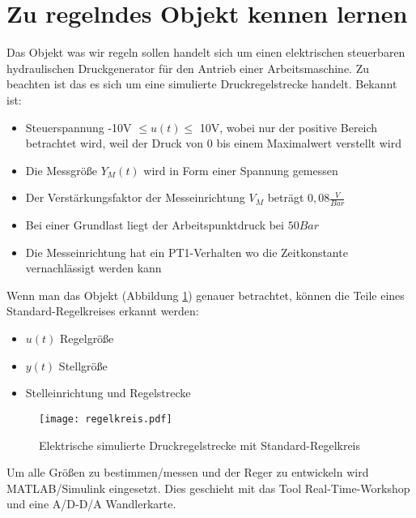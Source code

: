 
\newpage
[Hansert]
\section{Zu regelndes Objekt kennen lernen}
Das Objekt was wir regeln sollen handelt sich um einen elektrischen steuerbaren hydraulischen Druckgenerator für den Antrieb einer Arbeitsmaschine. Zu beachten ist das es sich um eine simulierte Druckregelstrecke handelt. Bekannt ist:

\begin{itemize}
\item Steuerspannung -10V $\leq u(t) \leq$ 10V, wobei nur der positive Bereich betrachtet wird, weil der Druck von 0 bis einem Maximalwert verstellt wird

\item Die Messgröße $Y_{M}(t)$ wird in Form einer Spannung gemessen

\item Der Verstärkungsfaktor der Messeinrichtung $V_{M}$ beträgt $0,08\frac{V}{Bar}$

\item Bei einer Grundlast liegt der Arbeitspunktdruck bei $50Bar$

\item Die Messeinrichtung hat ein PT1-Verhalten wo die Zeitkonstante vernachlässigt werden kann 
\end{itemize}


Wenn man das Objekt (Abbildung \ref{RegelKreis}) genauer betrachtet, können die Teile eines Standard-Regelkreises erkannt werden:
\begin{itemize}
\item $u(t)$ Regelgröße
\item $y(t)$ Stellgröße
\item Stelleinrichtung und Regelstrecke
\end{itemize}

\begin{figure}[htbp]
	\begin{center}
		\texttt{[image: regelkreis.pdf]}
		\caption{Elektrische simulierte Druckregelstrecke mit Standard-Regelkreis}
       \label{RegelKreis}
	\end{center} 
\end{figure}

\newpage

Um alle Größen zu bestimmen/messen und der Reger zu entwickeln wird MATLAB/Simulink eingesetzt. Dies geschieht mit das Tool Real-Time-Workshop und eine A/D-D/A Wandlerkarte.


